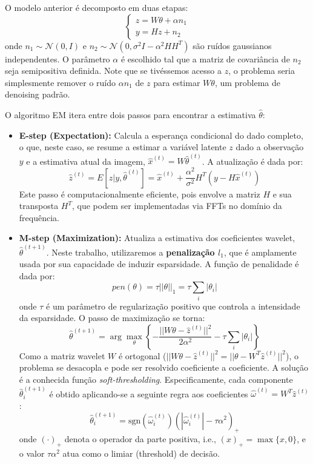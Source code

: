 \documentclass[12pt]{article}
\begin{document}
O modelo anterior é decomposto em duas etapas:
\[
\begin{cases}
z = W\theta + \alpha n_1 \\
y = Hz + n_2
\end{cases}
\]
onde $n_1 \sim \mathcal{N}(0, I)$ e $n_2 \sim \mathcal{N}(0, \sigma^2I - \alpha^2HH^T)$ são ruídos gaussianos independentes. O parâmetro $\alpha$ é escolhido tal que a matriz de covariância de $n_2$ seja semipositiva definida. Note que se tivéssemos acesso a $z$, o problema seria simplesmente remover o ruído $\alpha n_1$ de $z$ para estimar $W\theta$, um problema de denoising padrão.

O algoritmo EM itera entre dois passos para encontrar a estimativa $\hat{\theta}$:

\begin{itemize}
    \item \textbf{E-step (Expectation):} Calcula a esperança condicional do dado completo, o que, neste caso, se resume a estimar a variável latente $z$ dado a observação $y$ e a estimativa atual da imagem, $\hat{x}^{(t)} = W\hat{\theta}^{(t)}$. A atualização é dada por:
    \[
    \hat{z}^{(t)} = E[z|y, \hat{\theta}^{(t)}] = \hat{x}^{(t)} + \frac{\alpha^2}{\sigma^2} H^T(y - H\hat{x}^{(t)})
    \]
    Este passo é computacionalmente eficiente, pois envolve a matriz $H$ e sua transposta $H^T$, que podem ser implementadas via FFTs no domínio da frequência.
    
    \item \textbf{M-step (Maximization):} Atualiza a estimativa dos coeficientes wavelet, $\hat{\theta}^{(t+1)}$. Neste trabalho, utilizaremos a \textbf{penalização $l_1$}, que é amplamente usada por sua capacidade de induzir esparsidade. A função de penalidade é dada por:
    \[
    pen(\theta) = \tau||\theta||_1 = \tau \sum_i |\theta_i|
    \]
    onde $\tau$ é um parâmetro de regularização positivo que controla a intensidade da esparsidade. O passo de maximização se torna:
    \[
    \hat{\theta}^{(t+1)} = \arg \max_{\theta} \left\{ - \frac{||W\theta - \hat{z}^{(t)}||^2}{2\alpha^2} - \tau \sum_i |\theta_i| \right\}
    \]
    Como a matriz wavelet $W$ é ortogonal ($||W\theta - \hat{z}^{(t)}||^2 = ||\theta - W^T\hat{z}^{(t)}||^2$), o problema se desacopla e pode ser resolvido coeficiente a coeficiente. A solução é a conhecida função \textit{soft-thresholding}. Especificamente, cada componente $\hat{\theta}_i^{(t+1)}$ é obtido aplicando-se a seguinte regra aos coeficientes $\hat{\omega}^{(t)} = W^T\hat{z}^{(t)}$:
    \[
    \hat{\theta}_{i}^{(t+1)} = \text{sgn}(\hat{\omega}_{i}^{(t)}) (|\hat{\omega}_{i}^{(t)}| - \tau\alpha^2)_{+}
    \]
    onde $(\cdot)_+$ denota o operador da parte positiva, i.e., $(x)_+ = \max\{x, 0\}$, e o valor $\tau\alpha^2$ atua como o limiar (threshold) de decisão.
\end{itemize}
\end{document}

